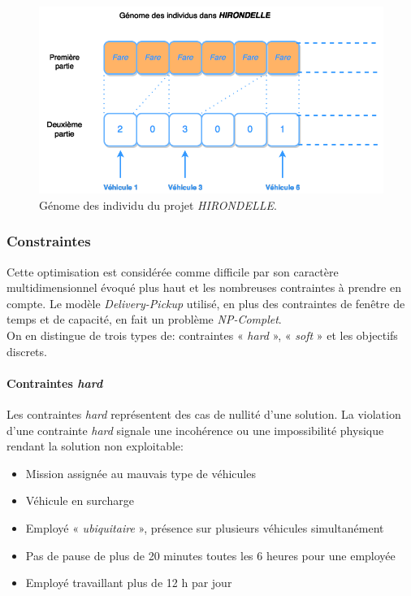 \documentclass[french, 11pt]{memoir}
\begin{document}
\begin{figure}[htbp]
	\begin{center}
		\includegraphics[width=5in]{img/individu.png}
		\caption{Génome des individu du projet \textit{HIRONDELLE}.}
	\end{center}
\end{figure}


\subsubsection{Constraintes}\label{constraintes}

Cette optimisation est considérée comme difficile par son caractère
multidimensionnel évoqué plus haut et les nombreuses contraintes à
prendre en compte. Le modèle \emph{Delivery-Pickup} utilisé, en plus des
contraintes de fenêtre de temps et de capacité, en fait un problème
\emph{NP-Complet}. \\
On en distingue de trois types de: contraintes « \emph{hard} », «
\emph{soft} » et les objectifs discrets.

\paragraph{Contraintes \emph{hard}}\label{contraintes-hard}

Les contraintes \emph{hard} représentent des cas de nullité d'une
solution. La violation d'une contrainte \emph{hard }signale une
incohérence ou une impossibilité physique rendant la solution non
exploitable:

\begin{itemize}
\item
  Mission assignée au mauvais type de véhicules
\item
  Véhicule en surcharge
\item
  Employé « \emph{ubiquitaire} », présence sur plusieurs véhicules
  simultanément
\item
  Pas de pause de plus de 20 minutes toutes les 6 heures pour une
  employée
\item
  Employé travaillant plus de 12 h par jour
\end{itemize}
\end{document}
